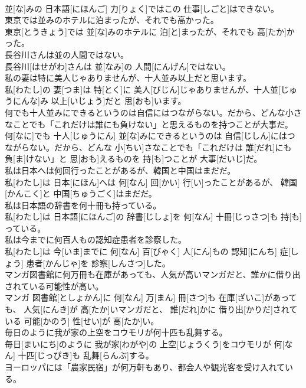 \documentclass[8pt]{extreport}
\begin{document}
\begin{CJK}{UTF8}{min}
\\	並[な]みの 日本語[にほんご] 力[りょく]ではこの 仕事[しごと]はできない。
\\	東京では並みのホテルに泊まったが、それでも高かった。	
\\	東京[とうきょう]では 並[な]みのホテルに 泊[と]まったが、それでも 高[たか]かった。
\\	長谷川さんは並の人間ではない。	
\\	長谷川[はせがわ]さんは 並[なみ]の 人間[にんげん]ではない。
\\	私の妻は特に美人じゃありませんが、十人並み以上だと思います。	
\\	私[わたし]の 妻[つま]は 特[とく]に 美人[びじん]じゃありませんが、十人並[じゅうにんな]み 以上[いじょう]だと 思[おも]います。
\\	何でも十人並みにできるというのは自信にはつながらない。だから、どんな小さなことでも「これだけは誰にも負けない」と思えるものを持つことが大事だ。	
\\	何[なに]でも 十人[じゅうにん] 並[な]みにできるというのは 自信[じしん]にはつながらない。だから、どんな 小[ちい]さなことでも「これだけは 誰[だれ]にも 負[ま]けない」と 思[おも]えるものを 持[も]つことが 大事[だいじ]だ。
\\	私は日本へは何回行ったことがあるが、韓国と中国はまだだ。	
\\	私[わたし]は 日本[にほん]へは 何[なん] 回[かい] 行[い]ったことがあるが、 韓国[かんこく]と 中国[ちゅうごく]はまだだ。
\\	私は日本語の辞書を何十冊も持っている。	
\\	私[わたし]は 日本語[にほんご]の 辞書[じしょ]を 何[なん] 十冊[じっさつ]も 持[も]っている。
\\	私は今までに何百人もの認知症患者を診察した。	
\\	私[わたし]は 今[いま]までに 何[なん] 百[びゃく] 人[にん]もの 認知[にんち] 症[しょう] 患者[かんじゃ]を 診察[しんさつ]した。
\\	マンガ図書館に何万冊も在庫があっても、人気が高いマンガだと、誰かに借り出されている可能性が高い。	
\\	マンガ 図書館[としょかん]に 何[なん] 万[まん] 冊[さつ]も 在庫[ざいこ]があっても、 人気[にんき]が 高[たか]いマンガだと、 誰[だれ]かに 借り出[かりだ]されている 可能[かのう] 性[せい]が 高[たか]い。
\\	毎日のように我が家の上空をコウモリが何十匹も乱舞する。	
\\	毎日[まいにち]のように 我が家[わがや]の 上空[じょうくう]をコウモリが 何[なん] 十匹[じっぴき]も 乱舞[らんぶ]する。
\\	ヨーロッパには「農家民宿」が何万軒もあり、都会人や観光客を受け入れている。	

\end{CJK}
\end{document}
